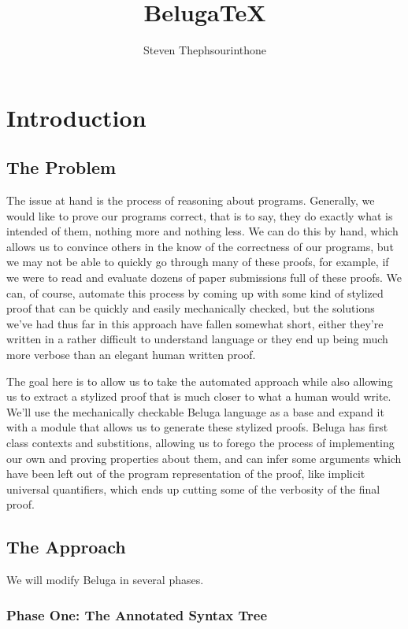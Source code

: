 \documentclass[11pt]{article} %
\title{BelugaTeX}
\author{Steven Thephsourinthone}
\begin{document}
\maketitle

\section{Introduction}


\subsection{The Problem}

The issue at hand is the process of reasoning about programs. Generally, we would like to prove our programs correct, that is to say, they do exactly what is intended of them, nothing more and nothing less. We can do this by hand, which allows us to convince others in the know of the correctness of our programs, but we may not be able to quickly go through many of these proofs, for example, if we were to read and evaluate dozens of paper submissions full of these proofs. We can, of course, automate this process by coming up with some kind of stylized proof that can be quickly and easily mechanically checked, but the solutions we've had thus far in this approach have fallen somewhat short, either they're written in a rather difficult to understand language or they end up being much more verbose than an elegant human written proof.

The goal here is to allow us to take the automated approach while also allowing us to extract a stylized proof that is much closer to what a human would write. We'll use the mechanically checkable Beluga language as a base and expand it with a module that allows us to generate these stylized proofs. Beluga has first class contexts and substitions, allowing us to forego the process of implementing our own and proving properties about them, and can infer some arguments which have been left out of the program representation of the proof, like implicit universal quantifiers, which ends up cutting some of the verbosity of the final proof.

\subsection{The Approach}

We will modify Beluga in several phases.

\subsubsection{Phase One: The Annotated Syntax Tree}
\end{document}
